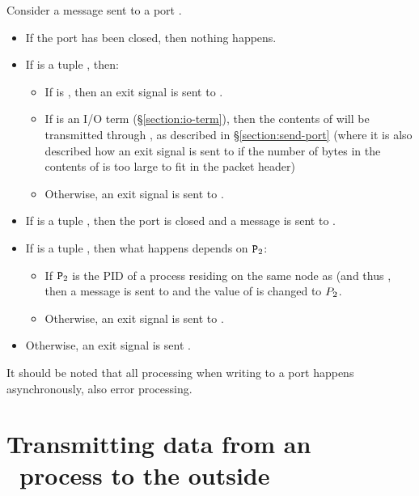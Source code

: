 Consider a message  sent to a port .
\begin{itemize}
\item If the port has been closed, then nothing happens.
\item If  is a tuple , then:
\begin{itemize}
\item If  is , then
an exit signal  is sent to .
\item If  is an I/O term (\S\ref{section:io-term}), then the contents
of  will be transmitted through , as described in
\S\ref{section:send-port} (where it is also described how an exit
signal  is sent to  if the number of bytes
in the contents of  is too large to fit in the packet header)
\item Otherwise, an exit signal  is sent to .
\end{itemize}
\item If  is a tuple , then
the port  is closed and a message  is sent
to .
\item If  is a tuple , then
what happens depends on ${\tt{\sl P}}_2$:
\begin{itemize}
\item If ${\tt{\sl P}}_2$ is the PID of a process residing on the same node as 
(and thus , then a message  is sent
to  and the value of  is changed to ${\sl P}_2$.
\item Otherwise, an exit signal  is sent to .
\end{itemize}
\item Otherwise, an exit signal  is sent .
\end{itemize}
It should be noted that
all processing when writing to a port happens asynchronously, also error processing.

\section{Transmitting data from an \Erlang\ process to the outside}

